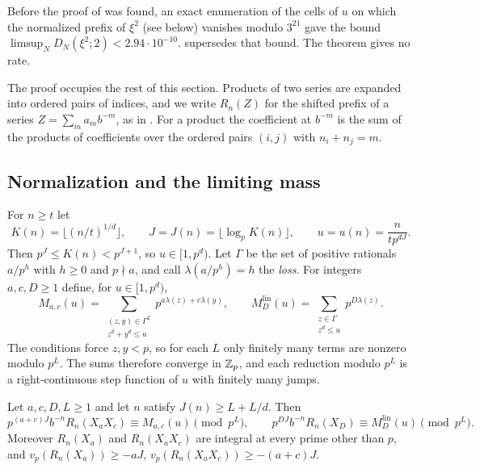 \documentclass[11pt]{article}
\begin{document}
\begin{remark}\label{rem:history}
Before the proof of  was found, an exact enumeration of the cells of $u$ on which
the normalized prefix of $\xi^2$ (see  below) vanishes modulo $3^{21}$ gave the bound
$\limsup_ND_N(\xi^2;2)<2.94\cdot10^{-10}$.  supersedes that
bound. The theorem gives no rate.
\end{remark}

The proof occupies the rest of this section. Products of two series are expanded into ordered pairs of
indices, and we write $R_n(Z)$ for the shifted prefix of a series $Z=\sum_ma_mb^{-m}$, as in
. For a product the coefficient at $b^{-m}$ is the sum of the products of
coefficients over the ordered pairs $(i,j)$ with $n_i+n_j=m$.

\subsection{Normalization and the limiting mass}\label{sec:quad-first}

For $n\ge t$ let
\[
K(n)=\lfloor(n/t)^{1/d}\rfloor,\qquad J=J(n)=\lfloor\log_pK(n)\rfloor,\qquad u=u(n)=\frac{n}{tp^{dJ}} .
\]
Then $p^J\le K(n)<p^{J+1}$, so $u\in[1,p^d)$. Let $\Gamma$ be the set of positive rationals $a/p^h$ with
$h\ge0$ and $p\nmid a$, and call $\lambda(a/p^h)=h$ the \emph{loss}. For integers $a,c,D\ge1$ define, for
$u\in[1,p^d)$,
\[
M_{a,c}(u)=\sum_{\substack{(z,y)\in\Gamma^2\\ z^d+y^d\le u}}p^{a\lambda(z)+c\lambda(y)},\qquad
M^{\mathrm{lin}}_D(u)=\sum_{\substack{z\in\Gamma\\ z^d\le u}}p^{D\lambda(z)} .
\]
The conditions force $z,y<p$, so for each $L$ only finitely many terms are nonzero modulo $p^L$. The
sums therefore converge in $\mathbb Z_p$, and each reduction modulo $p^L$ is a right-continuous step function
of $u$ with finitely many jumps.

\begin{lemma}[Freezing]\label{lem:freeze}
Let $a,c,D,L\ge1$ and let $n$ satisfy $J(n)\ge L+L/d$. Then
\[
p^{(a+c)J}b^{-n}R_n(X_aX_c)\equiv M_{a,c}(u)\pmod{p^L},\qquad
p^{DJ}b^{-n}R_n(X_D)\equiv M^{\mathrm{lin}}_D(u)\pmod{p^L}.
\]
Moreover $R_n(X_a)$ and $R_n(X_aX_c)$ are integral at every prime other than $p$, and
$v_p(R_n(X_a))\ge-aJ$, $v_p(R_n(X_aX_c))\ge-(a+c)J$.
\end{lemma}
\end{document}
